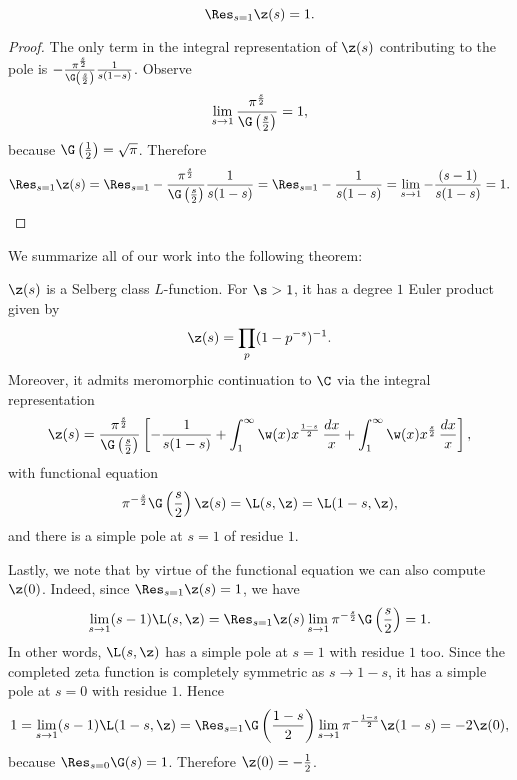       \begin{proposition}\label{prop:zeta_residue}
        \[
          \Res_{s = 1}\z(s) = 1.
        \]
      \end{proposition}
      \begin{proof}
        The only term in the integral representation of $\z(s)$ contributing to the pole is $-\frac{\pi^{\frac{s}{2}}}{\G\left(\frac{s}{2}\right)}\frac{1}{s(1-s)}$. Observe
        \[
          \lim_{s \to 1}\frac{\pi^{\frac{s}{2}}}{\G\left(\frac{s}{2}\right)} = 1,
        \]
        because $\G\left(\frac{1}{2}\right) = \sqrt{\pi}$. Therefore
        \[
          \Res_{s = 1}\z(s) = \Res_{s = 1}-\frac{\pi^{\frac{s}{2}}}{\G\left(\frac{s}{2}\right)}\frac{1}{s(1-s)} = \Res_{s = 1}-\frac{1}{s(1-s)} = \lim_{s \to 1}-\frac{(s-1)}{s(1-s)} = 1.
        \]
      \end{proof}

      We summarize all of our work into the following theorem:

      \begin{theorem}\label{thm:zeta_Selberg}
        $\z(s)$ is a Selberg class $L$-function. For $\s > 1$, it has a degree $1$ Euler product given by
        \[
          \z(s) = \prod_{p}(1-p^{-s})^{-1}.
        \]
        Moreover, it admits meromorphic continuation to $\C$ via the integral representation
        \[
          \z(s) = \frac{\pi^{\frac{s}{2}}}{\G\left(\frac{s}{2}\right)}\left[-\frac{1}{s(1-s)}+\int_{1}^{\infty}\w(x)x^{\frac{1-s}{2}}\,\frac{dx}{x}+\int_{1}^{\infty}\w(x)x^{\frac{s}{2}}\,\frac{dx}{x}\right],
        \]
        with functional equation
        \[
          \pi^{-\frac{s}{2}}\G\left(\frac{s}{2}\right)\z(s) = \L(s,\z) = \L(1-s,\z),
        \]
        and there is a simple pole at $s = 1$ of residue $1$.
      \end{theorem}

      Lastly, we note that by virtue of the functional equation we can also compute $\z(0)$. Indeed, since $\Res_{s = 1}\z(s) = 1$, we have
      \[
        \lim_{s \to 1}(s-1)\L(s,\z) = \Res_{s = 1}\z(s)\lim_{s \to 1}\pi^{-\frac{s}{2}}\G\left(\frac{s}{2}\right) = 1.
      \]
      In other words, $\L(s,\z)$ has a simple pole at $s = 1$ with residue $1$ too. Since the completed zeta function is completely symmetric as $s \to 1-s$, it has a simple pole at $s = 0$ with residue $1$. Hence
      \[
        1 = \lim_{s \to 1}(s-1)\L(1-s,\z) = \Res_{s = 1}\G\left(\frac{1-s}{2}\right)\lim_{s \to 1}\pi^{-\frac{1-s}{2}}\z(1-s) = -2\z(0),
      \]
      because $\Res_{s = 0}\G(s) = 1$. Therefore $\z(0) = -\frac{1}{2}$.
